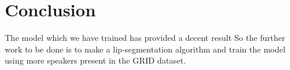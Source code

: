     \chapter{Conclusion}
    The model which we have trained has provided a decent result So the further work to be done is to make a lip-segmentation algorithm and train the model using more speakers present in the GRID dataset.
